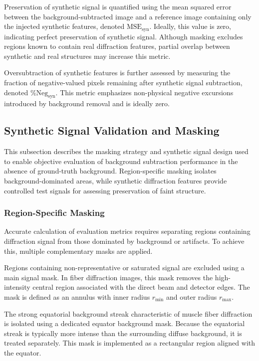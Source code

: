 \documentclass[iucr,review]{iucrjournals}
\begin{document}
Preservation of synthetic signal is quantified using the mean squared error between the background-subtracted image and a reference image containing only the injected synthetic features, denoted $\mathrm{MSE}_{\mathrm{syn}}$. Ideally, this value is zero, indicating perfect preservation of synthetic signal. Although masking excludes regions known to contain real diffraction features, partial overlap between synthetic and real structures may increase this metric.

Oversubtraction of synthetic features is further assessed by measuring the fraction of negative-valued pixels remaining after synthetic signal subtraction, denoted $\%\mathrm{Neg}_{\mathrm{syn}}$. This metric emphasizes non-physical negative excursions introduced by background removal and is ideally zero.




\subsection{Synthetic Signal Validation and Masking}

This subsection describes the masking strategy and synthetic signal design used to enable objective evaluation of background subtraction performance in the absence of ground-truth background. Region-specific masking isolates background-dominated areas, while synthetic diffraction features provide controlled test signals for assessing preservation of faint structure.

\subsubsection{Region-Specific Masking}

Accurate calculation of evaluation metrics requires separating regions containing diffraction signal from those dominated by background or artifacts. To achieve this, multiple complementary masks are applied.

Regions containing non-representative or saturated signal are excluded using a main signal mask. In fiber diffraction images, this mask removes the high-intensity central region associated with the direct beam and detector edges. The mask is defined as an annulus with inner radius $r_{\mathrm{min}}$ and outer radius $r_{\mathrm{max}}$.

The strong equatorial background streak characteristic of muscle fiber diffraction is isolated using a dedicated equator background mask. Because the equatorial streak is typically more intense than the surrounding diffuse background, it is treated separately. This mask is implemented as a rectangular region aligned with the equator.
\end{document}
